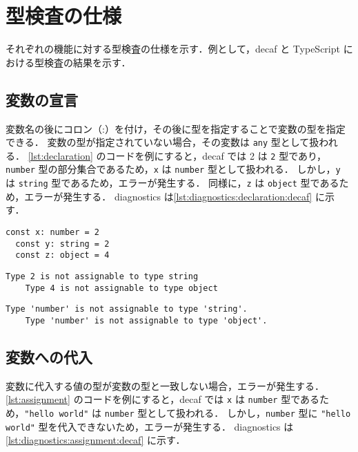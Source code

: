 \chapter{型検査の仕様}

それぞれの機能に対する型検査の仕様を示す．例として，decaf と TypeScript における型検査の結果を示す．

\section{変数の宣言}

変数名の後にコロン（:）を付け，その後に型を指定することで変数の型を指定できる．
変数の型が指定されていない場合，その変数は \texttt{any} 型として扱われる．
\ref{lst:declaration} のコードを例にすると，decaf では 2 は \texttt{2} 型であり，\texttt{number} 型の部分集合であるため，\texttt{x} は \texttt{number} 型として扱われる．
しかし，\texttt{y} は \texttt{string} 型であるため，エラーが発生する．
同様に，\texttt{z} は \texttt{object} 型であるため，エラーが発生する．
diagnostics は\ref{lst:diagnostics:declaration:decaf} に示す．

\begin{lstlisting}[caption=変数宣言の例, label=lst:declaration]
  const x: number = 2
  const y: string = 2
  const z: object = 4
\end{lstlisting}

\begin{minipage}{0.45\textwidth}
    \begin{lstlisting}[caption=decaf の diagnostics, label=lst:diagnostics:declaration:decaf]
    Type 2 is not assignable to type string
    Type 4 is not assignable to type object
  \end{lstlisting}
\end{minipage}
\hfill
\begin{minipage}{0.45\textwidth}
    \begin{lstlisting}[caption=tsc の diagnostics, label=lst:diagnostics:declaration:tsc]
    Type 'number' is not assignable to type 'string'.
    Type 'number' is not assignable to type 'object'.
  \end{lstlisting}
\end{minipage}

\section{変数への代入}

変数に代入する値の型が変数の型と一致しない場合，エラーが発生する．
\ref{lst:assignment} のコードを例にすると，decaf では \texttt{x} は \texttt{number} 型であるため，\texttt{"hello world"} は \texttt{number} 型として扱われる．
しかし，\texttt{number} 型に \texttt{"hello world"} 型を代入できないため，エラーが発生する．
diagnostics は\ref{lst:diagnostics:assignment:decaf} に示す．

